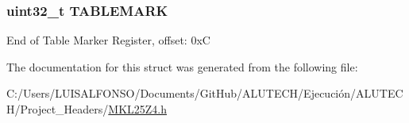 \subsubsection[{T\+A\+B\+L\+E\+M\+A\+R\+K}]{\setlength{\rightskip}{0pt plus 5cm}uint32\+\_\+t T\+A\+B\+L\+E\+M\+A\+R\+K}\label{struct_r_o_m___mem_map_af2183c9d5dbc69a514ecef0aa2d22ed3}
End of Table Marker Register, offset\+: 0x\+C 

The documentation for this struct was generated from the following file\+:\begin{DoxyCompactItemize}
\item 
C\+:/\+Users/\+L\+U\+I\+S\+A\+L\+F\+O\+N\+S\+O/\+Documents/\+Git\+Hub/\+A\+L\+U\+T\+E\+C\+H/\+Ejecución/\+A\+L\+U\+T\+E\+C\+H/\+Project\+\_\+\+Headers/\hyperlink{_m_k_l25_z4_8h}{M\+K\+L25\+Z4.\+h}\end{DoxyCompactItemize}
